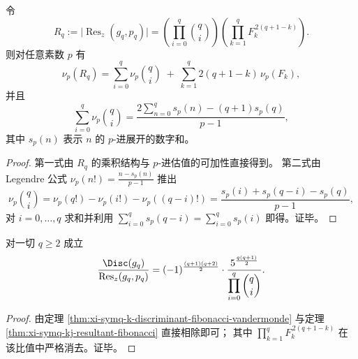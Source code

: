 \begin{proposition}\label{prop:xi-symq-resultant-padic-valuation}
令
\[
R_q:=\bigl|\operatorname{Res}_z(g_q,p_q)\bigr|
=\left(\prod_{i=0}^{q}\binom{q}{i}\right)\left(\prod_{k=1}^{q}F_k^{\,2(q+1-k)}\right).
\]
则对任意素数 \(p\) 有
\[
\nu_p(R_q)=\sum_{i=0}^{q}\nu_p\!\binom{q}{i}
\;+\;\sum_{k=1}^{q}2(q+1-k)\,\nu_p(F_k),
\]
并且
\[
\sum_{i=0}^{q}\nu_p\!\binom{q}{i}
=\frac{2\sum_{n=0}^{q}s_p(n)-(q+1)s_p(q)}{p-1},
\]
其中 \(s_p(n)\) 表示 \(n\) 的 \(p\)-进展开的数字和。
\end{proposition}
\begin{proof}
第一式由 \(R_q\) 的乘积结构与 \(p\)-进估值的可加性直接得到。
第二式由 Legendre 公式
\(
\nu_p(n!)=\frac{n-s_p(n)}{p-1}
\)
推出
\[
\nu_p\binom{q}{i}
=\nu_p(q!)-\nu_p(i!)-\nu_p((q-i)!)
=\frac{s_p(i)+s_p(q-i)-s_p(q)}{p-1},
\]
对 \(i=0,\dots,q\) 求和并利用 \(\sum_{i=0}^{q}s_p(q-i)=\sum_{i=0}^{q}s_p(i)\) 即得。证毕。
\end{proof}

\begin{proposition}\label{prop:xi-symq-disc-over-resultant-pure-5-defect}
对一切 \(q\ge 2\) 成立
\[
\frac{\Disc(g_q)}{\operatorname{Res}_z(g_q,p_q)}
=(-1)^{\frac{(q+1)(q+2)}2}\cdot
\frac{5^{\frac{q(q+1)}2}}{\displaystyle\prod_{i=0}^{q}\binom{q}{i}}.
\]
\end{proposition}
\begin{proof}
由定理 \ref{thm:xi-symq-k-discriminant-fibonacci-vandermonde} 与定理 \ref{thm:xi-symq-kj-resultant-fibonacci} 直接相除即可；
其中 \(\prod_{k=1}^{q}F_k^{\,2(q+1-k)}\) 在该比值中严格消去。证毕。
\end{proof}

\endinput

